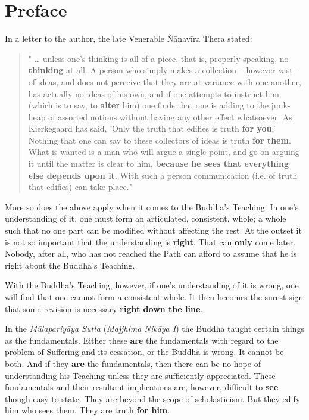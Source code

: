 \chapter{Preface}

In a letter to the author, the late Venerable Ñāṇavīra Thera stated:


\begin{quotation}
" … unless one’s thinking is all-of-a-piece, that is, properly speaking,
no \textbf{thinking} at all. A person who simply makes a collection – however
vast – of ideas, and does not perceive that they are at variance with
one another, has actually no ideas of his own, and if one attempts to
instruct him (which is to say, to \textbf{alter} him) one finds that one is
adding to the junk-heap of assorted notions without having any other
effect whatsoever. As Kierkegaard has said, 'Only the truth that edifies
is truth \textbf{for you}.' Nothing that one can say to these collectors of
ideas is truth \textbf{for them}. What is wanted is a man who will argue a
single point, and go on arguing it until the matter is clear to him,
\textbf{because he sees that everything else depends upon it}. With such a
person communication (i.e. of truth that edifies) can take place."


\end{quotation}

More so does the above apply when it comes to the Buddha’s Teaching. In
one’s understanding of it, one must form an articulated, consistent,
whole; a whole such that no one part can be modified without affecting
the rest. At the outset it is not so important that the understanding is
\textbf{right}. That can \textbf{only} come later. Nobody, after all, who has not
reached the Path can afford to assume that he is right about the
Buddha’s Teaching.


With the Buddha’s Teaching, however, if one’s understanding of it is
wrong, one will find that one cannot form a consistent whole. It then
becomes the surest sign that some revision is necessary \textbf{right down the line}.


In the \emph{Mūlapariyāya Sutta} (\emph{Majjhima Nikāya I}) the Buddha taught
certain things as the fundamentals. Either these \textbf{are} the fundamentals
with regard to the problem of Suffering and its cessation, or the Buddha
is wrong. It cannot be both. And if they \textbf{are} the fundamentals, then
there can be no hope of understanding his Teaching unless they are
sufficiently appreciated. These fundamentals and their resultant
implications are, however, difficult to \textbf{see} though easy to state. They
are beyond the scope of scholasticism. But they edify him who sees them.
They are truth \textbf{for him}.


